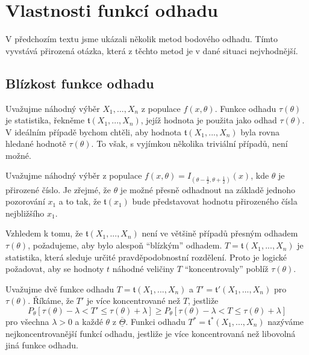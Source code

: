 \section{Vlastnosti funkcí odhadu}

V předchozím textu jsme ukázali několik metod bodového odhadu. Tímto vyvstává přirozená otázka, která z těchto metod je v dané situaci nejvhodnější.

\subsection{Blízkost funkce odhadu}

Uvažujme náhodný výběr $X_1, ..., X_n$ z populace $f(x, \theta)$. Funkce odhadu $\tau(\theta)$ je statistika, řekněme $\mathfrak{t}(X_1, ..., X_n)$, jejíž hodnota je použita jako odhad $\tau(\theta)$. V ideálním případě bychom chtěli, aby hodnota $\mathfrak{t}(X_1, ..., X_n)$ byla rovna hledané hodnotě $\tau(\theta)$. To však, s vyjímkou několika triviální případů, není možné.

\begin{example}
Uvažujme náhodný výběr z populace $f(x, \theta) = I_{(\theta - \frac{1}{2}, \theta + \frac{1}{2})}(x)$, kde $\theta$ je přirozené číslo. Je zřejmé, že $\theta$ je možné přesně odhadnout na základě jednoho pozorování $x_1$ a to tak, že $\mathfrak{t}(x_1)$ bude představovat hodnotu přirozeného čísla nejbližšího $x_1$.
\end{example}

Vzhledem k tomu, že $\mathfrak{t}(X_1, ..., X_n)$ není ve většině případů přesným odhadem $\tau(\theta)$, požadujeme, aby bylo alespoň ``blízkým'' odhadem. $T = \mathfrak{t}(X_1, ..., X_n)$ je statistika, která sleduje určité pravděpodobnostní rozdělení. Proto je logické požadovat, aby se hodnoty $t$ náhodné veličiny $T$ ``koncentrovaly'' poblíž $\tau(\theta)$.

\begin{definition}
Uvažujme dvě funkce odhadu $T = \mathfrak{t}(X_1, ..., X_n)$ a $T' = \mathfrak{t}'(X_1, ..., X_n)$ pro $\tau(\theta)$. Říkáme, že $T'$ je více koncentrované než $T$, jestliže
\begin{equation*}
P_{\theta}[\tau(\theta) - \lambda < T' \le \tau(\theta) + \lambda] \ge P_{\theta}[\tau(\theta) - \lambda < T \le \tau(\theta) + \lambda]
\end{equation*}
pro všechna $\lambda > 0$ a každé $\theta$ z $\overline{\underline{\Theta}}$. Funkci odhadu $T^* = \mathfrak{t}^*(X_1, ..., X_n)$ nazýváme nejkoncentrovanější funkcí odhadu, jestliže je více koncentrovaná než libovolná jiná funkce odhadu.
\end{definition}


